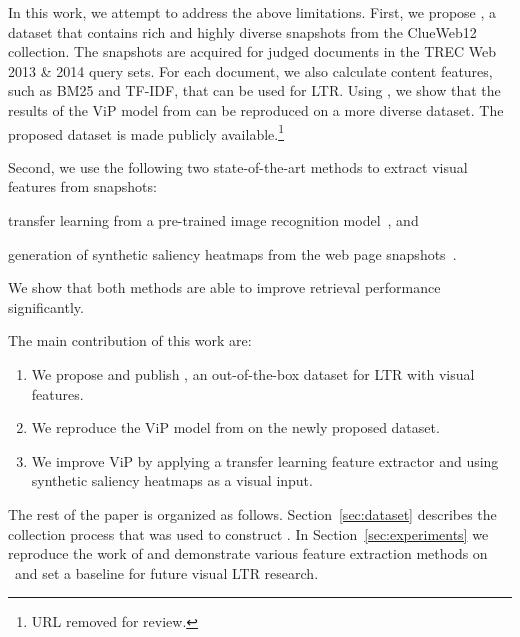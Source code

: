 
In this work, we attempt to address the above limitations.
First, we propose \datasetname, a dataset that contains rich and highly diverse snapshots from the ClueWeb12 collection. The snapshots are acquired for judged documents in the TREC Web 2013 \& 2014 query sets. For each document, we also calculate content features, such as BM25 and TF-IDF, that can be used for \ac{LTR}.
%
Using \datasetname, we show that the results of the ViP model from \citet{fan2017learning} can be reproduced on a more diverse dataset.
The proposed dataset is made publicly available.\footnote{URL removed for review.}

Second, we use the following two state-of-the-art methods to extract visual features from snapshots:
\begin{inparaenum}[(i)]
\item transfer learning from a pre-trained image recognition model~\cite{donahue2014decaf,simonyan2014very}, and
\item generation of synthetic saliency heatmaps from the web page snapshots~\cite{shen2014webpage,shan2017two}.
\end{inparaenum}
We show that both methods are able to improve retrieval performance significantly.

The main contribution of this work are:
\begin{enumerate}  
\item We propose and publish \datasetname, an out-of-the-box dataset for \ac{LTR} with visual features.
\item We reproduce the ViP model from \cite{fan2017learning} on the newly proposed dataset.
\item We improve ViP by applying a transfer learning feature extractor and using synthetic saliency heatmaps as a visual input.
\end{enumerate}

 The rest of the paper is organized as follows. Section~\ref{sec:dataset} describes the collection process that was used to construct \datasetname. In Section~\ref{sec:experiments} we reproduce the work of \citet{fan2017learning} and demonstrate various feature extraction methods on \datasetname~and set a baseline for future visual \ac{LTR} research.  
